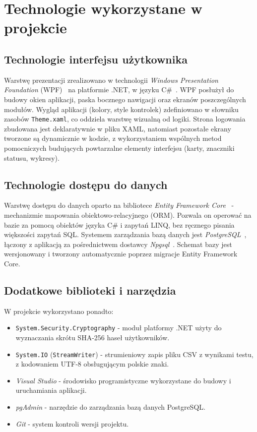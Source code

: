 ﻿\chapter{Technologie wykorzystane w projekcie}
\label{cha:technologie}

\section{Technologie interfejsu użytkownika}
\label{sec:techUI}

Warstwę prezentacji zrealizowano w technologii \emph{Windows Presentation Foundation}
(WPF)~\cite{msdocsWPF} na platformie .NET, w języku C\#~\cite{msdocsCSharp}. WPF posłużył do budowy
okien aplikacji, paska bocznego nawigacji oraz ekranów poszczególnych modułów. Wygląd aplikacji
(kolory, style kontrolek) zdefiniowano w słowniku zasobów \texttt{Theme.xaml}, co oddziela warstwę
wizualną od logiki. Strona logowania zbudowana jest deklaratywnie w pliku XAML, natomiast pozostałe
ekrany tworzone są dynamicznie w kodzie, z wykorzystaniem wspólnych metod pomocniczych budujących
powtarzalne elementy interfejsu (karty, znaczniki statusu, wykresy).

\section{Technologie dostępu do danych}
\label{sec:techDane}

Warstwę dostępu do danych oparto na bibliotece \emph{Entity Framework Core}~\cite{msdocsEFCore} -
mechanizmie mapowania obiektowo-relacyjnego (ORM). Pozwala on operować na bazie za pomocą obiektów
języka C\# i zapytań LINQ, bez ręcznego pisania większości zapytań SQL. Systemem zarządzania bazą danych jest
\emph{PostgreSQL}~\cite{postgresql}, łączony z aplikacją za pośrednictwem dostawcy
\emph{Npgsql}~\cite{npgsql}. Schemat bazy jest wersjonowany i tworzony automatycznie poprzez migracje
Entity Framework Core.

\section{Dodatkowe biblioteki i narzędzia}
\label{sec:techDodatkowe}

W projekcie wykorzystano ponadto:

\begin{itemize}
  \item \texttt{System.Security.Cryptography} - moduł platformy .NET użyty do wyznaczania skrótu
        SHA-256 haseł użytkowników.
  \item \texttt{System.IO} (\texttt{StreamWriter}) - strumieniowy zapis pliku CSV z wynikami testu,
        z kodowaniem UTF-8 obsługującym polskie znaki.
  \item \emph{Visual Studio} - środowisko programistyczne wykorzystane do budowy i uruchamiania
        aplikacji.
  \item \emph{pgAdmin} - narzędzie do zarządzania bazą danych PostgreSQL.
  \item \emph{Git} - system kontroli wersji projektu.
\end{itemize}

